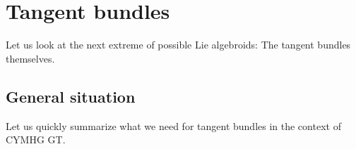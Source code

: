 \section{Tangent bundles} \label{TangentBundles}

Let us look at the next extreme of possible Lie algebroids: The tangent bundles themselves.

\subsection{General situation}\label{GeneralSituForTangent}

Let us quickly summarize what we need for tangent bundles in the context of CYMHG GT.

